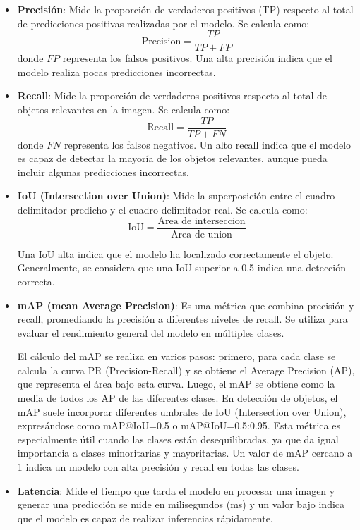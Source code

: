 \documentclass[11pt,spanish,listoffigures,listoftables]{tfgetsinf}
\begin{document}
\begin{itemize}
   \item \textbf{Precisión}: Mide la proporción de verdaderos positivos (TP) respecto al total de predicciones positivas realizadas por el modelo. Se calcula como:
   \[
   \text{Precision} = \frac{TP}{TP + FP}
   \]
   donde $FP$ representa los falsos positivos. Una alta precisión indica que el modelo realiza pocas predicciones incorrectas.

   \item \textbf{Recall}: Mide la proporción de verdaderos positivos respecto al total de objetos relevantes en la imagen. Se calcula como:
   \[
   \text{Recall} = \frac{TP}{TP + FN}
   \]
   donde $FN$ representa los falsos negativos. Un alto recall indica que el modelo es capaz de detectar la mayoría de los objetos relevantes, aunque pueda incluir algunas predicciones incorrectas.

   \item \textbf{IoU (Intersection over Union)}: Mide la superposición entre el cuadro delimitador predicho y el cuadro delimitador real. Se calcula como:
   \[
   \text{IoU} = \frac{\text{Area de interseccion}}{\text{Area de union}}
   \]

   Una IoU alta indica que el modelo ha localizado correctamente el objeto. Generalmente, se considera que una IoU superior a 0.5 indica una detección correcta.

   \item \textbf{mAP (mean Average Precision)}: Es una métrica que combina precisión y recall, promediando la precisión a diferentes niveles de recall. Se utiliza para evaluar el rendimiento general del modelo en múltiples clases. 
   
   El cálculo del mAP se realiza en varios pasos: primero, para cada clase se calcula la curva PR (Precision-Recall) y se obtiene el Average Precision (AP), que representa el área bajo esta curva. Luego, el mAP se obtiene como la media de todos los AP de las diferentes clases. En detección de objetos, el mAP suele incorporar diferentes umbrales de IoU (Intersection over Union), expresándose como mAP@IoU=0.5 o mAP@IoU=0.5:0.95. Esta métrica es especialmente útil cuando las clases están desequilibradas, ya que da igual importancia a clases minoritarias y mayoritarias. Un valor de mAP cercano a 1 indica un modelo con alta precisión y recall en todas las clases.

   \item \textbf{Latencia}: Mide el tiempo que tarda el modelo en procesar una imagen y generar una predicción se mide en milisegundos (ms) y un valor bajo indica que el modelo es capaz de realizar inferencias rápidamente.
   

\end{itemize}
\end{document}
